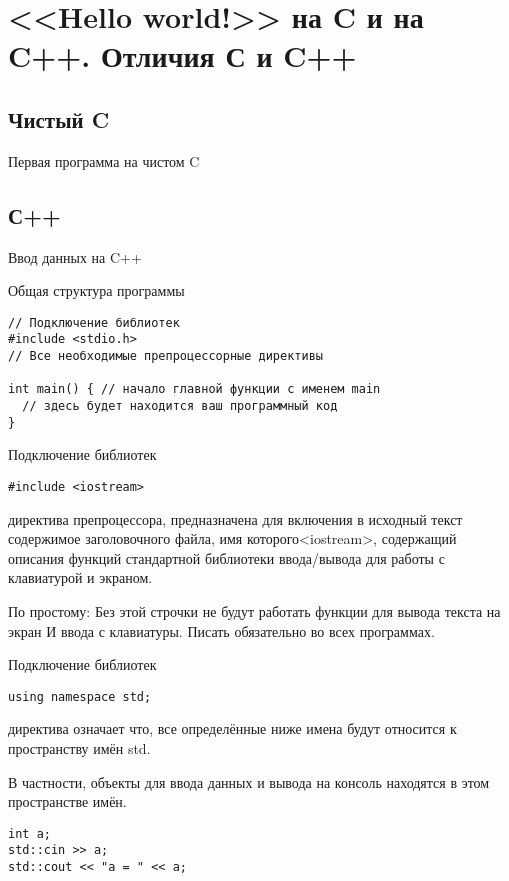 \section{<<Hello world!>> на C и на C++. Отличия С и C++}

\subsection{Чистый C}

\begin{frame}[t]{Первая программа на чистом C}
  
\end{frame}

\subsection{С++}

\begin{frame}[t]{Ввод данных на C++}
  
\end{frame}

\begin{frame}[t,fragile]{Общая структура программы}

\begin{lstlisting}
// Подключение библиотек
#include <stdio.h>
// Все необходимые препроцессорные директивы

int main() { // начало главной функции с именем main
  // здесь будет находится ваш программный код
}
\end{lstlisting}

\end{frame}

\begin{frame}[t,fragile]{Подключение библиотек}
\begin{lstlisting}
#include <iostream>
\end{lstlisting}
директива препроцессора, предназначена для включения в
 исходный текст содержимое заголовочного файла, имя которого<iostream>,
 содержащий описания функций стандартной библиотеки ввода/вывода для работы
с клавиатурой и экраном.

По простому: Без этой строчки не будут работать функции для вывода текста на экран
И ввода с клавиатуры. Писать обязательно во всех программах.
\end{frame}


\begin{frame}[t,fragile]{Подключение библиотек}
\begin{lstlisting}
using namespace std; 
\end{lstlisting}
 директива означает что, все определённые ниже имена будут
относится к пространству имён std.

В частности, объекты для ввода данных и вывода на консоль 
находятся в этом пространстве имён.

\begin{lstlisting}
int a;
std::cin >> a;
std::cout << "a = " << a;
\end{lstlisting}

\end{frame}


